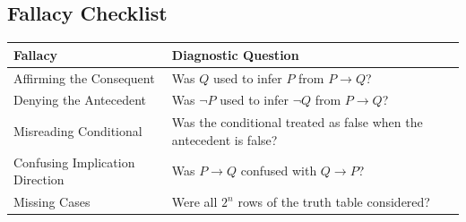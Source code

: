 \subsection{Fallacy Checklist}

\begin{center}
\renewcommand{\arraystretch}{1.4}
\begin{tabular}{|p{5cm}|p{8cm}|}
\hline
\textbf{Fallacy} & \textbf{Diagnostic Question} \\
\hline
Affirming the Consequent & Was $Q$ used to infer $P$ from $P \rightarrow Q$? \\
\hline
Denying the Antecedent & Was $\neg P$ used to infer $\neg Q$ from $P \rightarrow Q$? \\
\hline
Misreading Conditional & Was the conditional treated as false when the antecedent is false? \\
\hline
Confusing Implication Direction & Was $P \rightarrow Q$ confused with $Q \rightarrow P$? \\
\hline
Missing Cases & Were all $2^n$ rows of the truth table considered? \\
\hline
\end{tabular}
\end{center}

